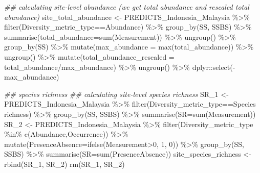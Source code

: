 \documentclass[
  letterpaper,
  DIV=11,
  numbers=noendperiod]{scrartcl}
\newenvironment{Shaded}{\begin{snugshade}}{\end{snugshade}}
\newcommand{\AttributeTok}[1]{\textcolor[rgb]{0.40,0.45,0.13}{#1}}
\newcommand{\DecValTok}[1]{\textcolor[rgb]{0.68,0.00,0.00}{#1}}
\newcommand{\DocumentationTok}[1]{\textcolor[rgb]{0.37,0.37,0.37}{\textit{#1}}}
\newcommand{\FunctionTok}[1]{\textcolor[rgb]{0.28,0.35,0.67}{#1}}
\newcommand{\NormalTok}[1]{\textcolor[rgb]{0.00,0.23,0.31}{#1}}
\newcommand{\OtherTok}[1]{\textcolor[rgb]{0.00,0.23,0.31}{#1}}
\newcommand{\SpecialCharTok}[1]{\textcolor[rgb]{0.37,0.37,0.37}{#1}}
\newcommand{\StringTok}[1]{\textcolor[rgb]{0.13,0.47,0.30}{#1}}
\begin{document}
\begin{Shaded}
\begin{Highlighting}[]
\DocumentationTok{\#\# calculating site{-}level abundance (we get total abundance and rescaled total abundance)}
\NormalTok{site\_total\_abundance }\OtherTok{\textless{}{-}}\NormalTok{ PREDICTS\_Indonesia\_Malaysia }\SpecialCharTok{\%\textgreater{}\%} 
  \FunctionTok{filter}\NormalTok{(Diversity\_metric\_type}\SpecialCharTok{==}\StringTok{\textquotesingle{}Abundance\textquotesingle{}}\NormalTok{) }\SpecialCharTok{\%\textgreater{}\%} 
  \FunctionTok{group\_by}\NormalTok{(SS, SSBS) }\SpecialCharTok{\%\textgreater{}\%} 
  \FunctionTok{summarise}\NormalTok{(}\AttributeTok{total\_abundance=}\FunctionTok{sum}\NormalTok{(Measurement)) }\SpecialCharTok{\%\textgreater{}\%} 
  \FunctionTok{ungroup}\NormalTok{() }\SpecialCharTok{\%\textgreater{}\%} 
  \FunctionTok{group\_by}\NormalTok{(SS) }\SpecialCharTok{\%\textgreater{}\%} 
  \FunctionTok{mutate}\NormalTok{(}\AttributeTok{max\_abundance =} \FunctionTok{max}\NormalTok{(total\_abundance)) }\SpecialCharTok{\%\textgreater{}\%} 
  \FunctionTok{ungroup}\NormalTok{() }\SpecialCharTok{\%\textgreater{}\%} 
  \FunctionTok{mutate}\NormalTok{(}\AttributeTok{total\_abundance\_rescaled =}\NormalTok{ total\_abundance}\SpecialCharTok{/}\NormalTok{max\_abundance) }\SpecialCharTok{\%\textgreater{}\%}  
  \FunctionTok{ungroup}\NormalTok{() }\SpecialCharTok{\%\textgreater{}\%} 
\NormalTok{  dplyr}\SpecialCharTok{::}\FunctionTok{select}\NormalTok{(}\SpecialCharTok{{-}}\NormalTok{max\_abundance)}

\DocumentationTok{\#\# species richness}
\DocumentationTok{\#\# calculating site{-}level species richness }
\NormalTok{SR\_1 }\OtherTok{\textless{}{-}}\NormalTok{ PREDICTS\_Indonesia\_Malaysia }\SpecialCharTok{\%\textgreater{}\%} 
  \FunctionTok{filter}\NormalTok{(Diversity\_metric\_type}\SpecialCharTok{==}\StringTok{\textquotesingle{}Species richness\textquotesingle{}}\NormalTok{) }\SpecialCharTok{\%\textgreater{}\%} 
  \FunctionTok{group\_by}\NormalTok{(SS, SSBS) }\SpecialCharTok{\%\textgreater{}\%} 
  \FunctionTok{summarise}\NormalTok{(}\AttributeTok{SR=}\FunctionTok{sum}\NormalTok{(Measurement))}
\NormalTok{SR\_2 }\OtherTok{\textless{}{-}}\NormalTok{ PREDICTS\_Indonesia\_Malaysia }\SpecialCharTok{\%\textgreater{}\%} 
  \FunctionTok{filter}\NormalTok{(Diversity\_metric\_type }\SpecialCharTok{\%in\%} \FunctionTok{c}\NormalTok{(}\StringTok{\textquotesingle{}Abundance\textquotesingle{}}\NormalTok{,}\StringTok{\textquotesingle{}Occurrence\textquotesingle{}}\NormalTok{)) }\SpecialCharTok{\%\textgreater{}\%} 
  \FunctionTok{mutate}\NormalTok{(}\AttributeTok{PresenceAbsence=}\FunctionTok{ifelse}\NormalTok{(Measurement}\SpecialCharTok{\textgreater{}}\DecValTok{0}\NormalTok{, }\DecValTok{1}\NormalTok{, }\DecValTok{0}\NormalTok{)) }\SpecialCharTok{\%\textgreater{}\%} 
  \FunctionTok{group\_by}\NormalTok{(SS, SSBS) }\SpecialCharTok{\%\textgreater{}\%} 
  \FunctionTok{summarise}\NormalTok{(}\AttributeTok{SR=}\FunctionTok{sum}\NormalTok{(PresenceAbsence))}
\NormalTok{site\_species\_richness }\OtherTok{\textless{}{-}} \FunctionTok{rbind}\NormalTok{(SR\_1, SR\_2)}
\FunctionTok{rm}\NormalTok{(SR\_1, SR\_2)}


\end{Highlighting}
\end{Shaded}
\end{document}
